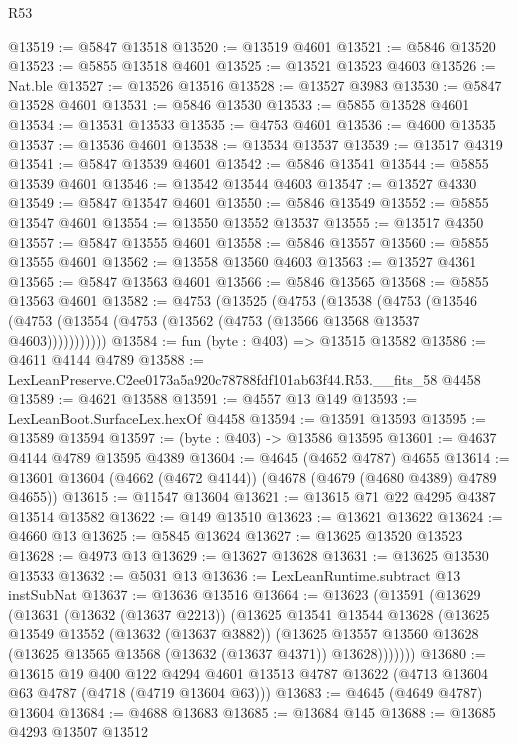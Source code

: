 \begin{lexlean}{R53}
\begin{coremodule}
@13519 := @5847 @13518
@13520 := @13519 @4601
@13521 := @5846 @13520
@13523 := @5855 @13518 @4601
@13525 := @13521 @13523 @4603
@13526 := Nat.ble
@13527 := @13526 @13516
@13528 := @13527 @3983
@13530 := @5847 @13528 @4601
@13531 := @5846 @13530
@13533 := @5855 @13528 @4601
@13534 := @13531 @13533
@13535 := @4753 @4601
@13536 := @4600 @13535
@13537 := @13536 @4601
@13538 := @13534 @13537
@13539 := @13517 @4319
@13541 := @5847 @13539 @4601
@13542 := @5846 @13541
@13544 := @5855 @13539 @4601
@13546 := @13542 @13544 @4603
@13547 := @13527 @4330
@13549 := @5847 @13547 @4601
@13550 := @5846 @13549
@13552 := @5855 @13547 @4601
@13554 := @13550 @13552 @13537
@13555 := @13517 @4350
@13557 := @5847 @13555 @4601
@13558 := @5846 @13557
@13560 := @5855 @13555 @4601
@13562 := @13558 @13560 @4603
@13563 := @13527 @4361
@13565 := @5847 @13563 @4601
@13566 := @5846 @13565
@13568 := @5855 @13563 @4601
@13582 := @4753
    (@13525
      (@4753
        (@13538
          (@4753 (@13546 (@4753 (@13554 (@4753 (@13562 (@4753 (@13566 @13568 @13537 @4603)))))))))))
@13584 := fun (byte : @403) => @13515 @13582
@13586 := @4611 @4144 @4789
@13588 := LexLeanPreserve.C2ee0173a5a920c78788fdf101ab63f44.R53.__fits_58 @4458
@13589 := @4621 @13588
@13591 := @4557 @13 @149
@13593 := LexLeanBoot.SurfaceLex.hexOf @4458
@13594 := @13591 @13593
@13595 := @13589 @13594
@13597 := (byte : @403) -> @13586 @13595
@13601 := @4637 @4144 @4789 @13595 @4389
@13604 := @4645 (@4652 @4787) @4655
@13614 := @13601 @13604 (@4662 (@4672 @4144)) (@4678 (@4679 (@4680 @4389) @4789 @4655))
@13615 := @11547 @13604
@13621 := @13615 @71 @22 @4295 @4387 @13514 @13582
@13622 := @149 @13510
@13623 := @13621 @13622
@13624 := @4660 @13
@13625 := @5845 @13624
@13627 := @13625 @13520 @13523
@13628 := @4973 @13
@13629 := @13627 @13628
@13631 := @13625 @13530 @13533
@13632 := @5031 @13
@13636 := LexLeanRuntime.subtract @13 instSubNat
@13637 := @13636 @13516
@13664 := @13623
    (@13591
      (@13629
        (@13631
          (@13632 (@13637 @2213))
          (@13625
            @13541
            @13544
            @13628
            (@13625
              @13549
              @13552
              (@13632 (@13637 @3882))
              (@13625
                @13557
                @13560
                @13628
                (@13625 @13565 @13568 (@13632 (@13637 @4371)) @13628)))))))
@13680 := @13615
    @19
    @400
    @122
    @4294
    @4601
    @13513
    @4787
    @13622
    (@4713 @13604 @63 @4787 (@4718 (@4719 @13604 @63)))
@13683 := @4645 (@4649 @4787) @13604
@13684 := @4688 @13683
@13685 := @13684 @145
@13688 := @13685 @4293 @13507 @13512

\end{coremodule}
\end{lexlean}
